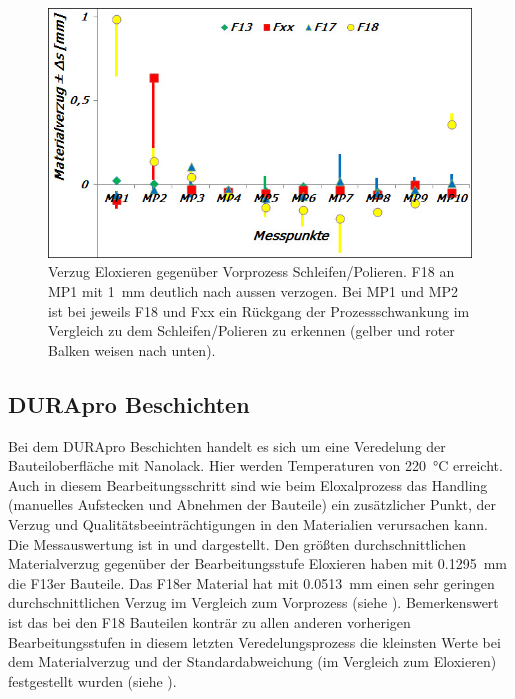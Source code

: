 \documentclass[12pt,a4paper,parskip,twoside,BCOR5mm,headsepline]{scrartcl}
\begin{document}
\begin{description*}
\begin{table}
\begin{tabular}{cccccccccccc}
\end{tabular}
\end{table}
\newpage

\begin{figure}[hbtp]
\centering
\includegraphics[width=.8\textwidth]{verzugelox}
\caption{Verzug Eloxieren gegenüber Vorprozess Schleifen/Polieren. F18 an MP1 mit \SI{1}{mm} deutlich nach aussen verzogen. Bei MP1 und MP2 ist bei jeweils F18 und Fxx ein Rückgang der Prozessschwankung im Vergleich zu dem Schleifen/Polieren zu erkennen (gelber und roter Balken weisen nach unten).}
\label{fig:verzugelox}
\end{figure}





\subsection{DURApro  Beschichten}
Bei dem DURApro Beschichten handelt es sich um eine Veredelung der Bauteiloberfläche mit Nanolack. Hier werden Temperaturen von  \SI{220}{\degreeCelsius} erreicht. Auch in diesem   
Bearbeitungsschritt sind wie beim Eloxalprozess das Handling (manuelles Aufstecken und Abnehmen der Bauteile) ein zusätzlicher Punkt,  der Verzug und Qualitätsbeeinträchtigungen in den Materialien verursachen kann. Die Messauswertung ist in  und  dargestellt. Den größten durchschnittlichen Materialverzug gegenüber der Bearbeitungsstufe  Eloxieren haben mit \SI{0,1295}{\milli\meter} die F13er Bauteile. Das F18er Material hat mit \SI{0,0513}{\milli\meter} einen sehr geringen durchschnittlichen Verzug im Vergleich zum Vorprozess (siehe ). Bemerkenswert ist das bei den F18 Bauteilen konträr zu allen anderen vorherigen Bearbeitungsstufen in diesem letzten Veredelungsprozess die kleinsten Werte bei dem Materialverzug und der Standardabweichung (im Vergleich zum Eloxieren) festgestellt wurden (siehe ).



\end{description*}
\end{document}
